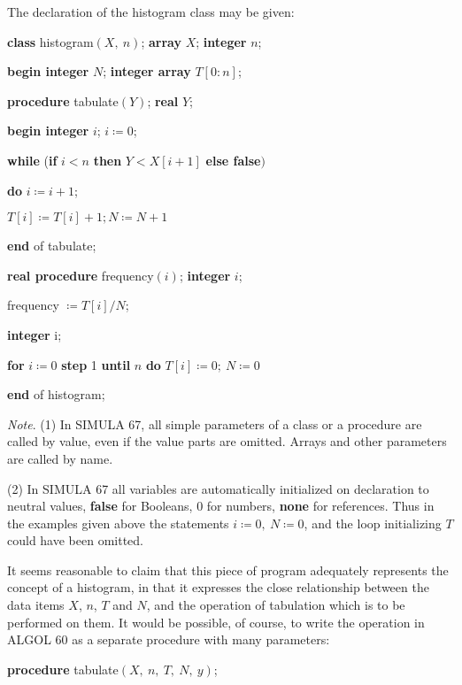 The declaration of the histogram class may be given:

\quad \textbf{class} histogram$(X,\ n)$; \textbf{array} $X$; \textbf{integer} $n$;

\quad \quad \textbf{begin integer} $N$; \textbf{integer array} $T[0:n]$;

\quad \quad \quad \textbf{procedure} tabulate$(Y)$; \textbf{real} $Y$;

\quad \quad \quad \quad \textbf{begin integer} $i$; $i\coloneq 0$;

\quad \quad \quad \quad \quad \textbf{while} (\textbf{if} $i < n$ \textbf{then} $Y < X[i + 1]$ \textbf{else false}$)$

\quad \quad \quad \quad \quad \quad \textbf{do} $i\coloneq i + 1$;

\quad \quad \quad \quad \quad $T[i] \coloneq T[i] + 1; N\coloneq N + 1$

\quad \quad \quad \quad \textbf{end} of tabulate;

\quad \quad \quad \textbf{real procedure} frequency$(i)$; \textbf{integer} $i$;

\quad \quad \quad \quad frequency $\coloneq T[i]/N$;

\quad \quad \quad \textbf{integer} i;

\quad \quad \quad \textbf{for} $i\coloneq 0$ \textbf{step} 1 \textbf{until} $n$ \textbf{do} $T[i]\coloneq 0;\ N\coloneq 0$

\quad \textbf{end} of histogram;

\textit{Note}. (1) In SIMULA 67, all simple parameters of a class or a procedure are called by value, even if the value parts are omitted. Arrays and other parameters are called by name.

(2) In SIMULA 67 all variables are automatically initialized on declaration to neutral values, \textbf{false} for Booleans, 0 for numbers, \textbf{none} for references. Thus in the examples given above the statements $i\coloneq 0,\ N\coloneq 0$, and the loop initializing $T$ could have been omitted.

It seems reasonable to claim that this piece of program adequately represents the concept of a histogram, in that it expresses the close relationship between the data items $X$, $n$, $T$ and $N$, and the operation of tabulation which
is to be performed on them. It would be possible, of course, to write the
operation in ALGOL 60 as a separate procedure with many parameters:

\quad \textbf{procedure} tabulate$(X,\ n,\ T,\ N,\ y)$;

